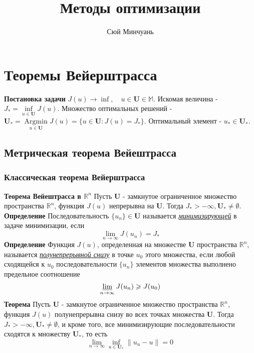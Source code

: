 \documentclass[A4]{article}
\begin{document}
\author{Сюй Минчуань}
\title{Методы оптимизации}
\maketitle
 \tableofcontents
\newpage
\section{Теоремы Вейерштрасса}
\textbf{Постановка задачи} $J(u)\rightarrow\inf,\quad u\in\mathbf{U}\in\mathbb{M}$. Искомая величина - $J_*=\inf\limits_{u\in\mathbf{U}}J(u)$. Множество оптимальных решений - $\mathbf{U}_*=\underset{u\in\mathbf{U}}{\operatorname{Argmin}}J(u)=\{u\in\mathbf{U}:J(u)=J_*\}$. Оптимальный элемент - $u_*\in\mathbf{U}_*$.\\
\subsection{Метрическая теорема Вейештрасса}
\subsubsection{Классическая теорема Вейерштрасса} 
\textbf{Теорема Вейештрасса в $\mathbb{R}^n$} Пусть $\mathbf{U}$ - замкнутое ограниченное множество пространства $\mathbb{R}^n$, функция $J(u)$ непрерывна на $\mathbf{U}$. Тогда $J_*>-\infty,\mathbf{U}_*\ne\emptyset$.\\
\textbf{Определение} Последовательность $\{u_n\}\in\mathbf{U}$ называется \underline{\emph{минимизирующей}} в задаче минимизации, если
\begin{equation*}
\lim_{n\rightarrow\infty}J(u_n)=J_*
\end{equation*}
\textbf{Определение} Функция $J(u)$, определенная на множестве $\mathbf{U}$ пространства $\mathbb{R}^n$, называется \underline{\emph{полунепрерывной снизу}} в точке $u_0$ этого множества, если любой сходящейся к $u_0$ последовательности $\{u_n\}$ элементов множества выполнено предельное соотношение
\begin{equation*}
\varliminf_{n\rightarrow\infty} J(u_n)\geqslant J(u_0)
\end{equation*}
\textbf{Теорема} Пусть $\mathbf{U}$ - замкнутое ограниченное множество пространства $\mathbb{R}^n$, функция $J(u)$ полунепрерывна снизу во всех точках множества $\mathbf{U}$. Тогда $J_*>-\infty,\mathbf{U}_*\ne\emptyset$, и кроме того, все минимизирующие последовательности сходятся к множеству $\mathbf{U}_*$, то есть 
\begin{equation*}
\lim_{n\rightarrow\infty}\inf_{u\in\mathbf{U}_*}\|u_n-u\|=0
\end{equation*}
\end{document}
